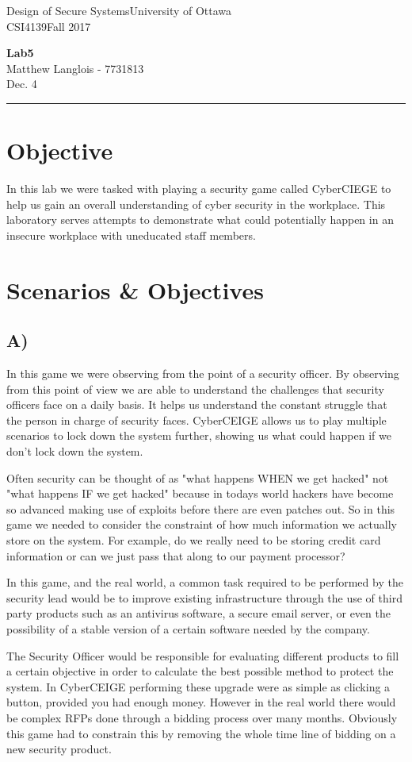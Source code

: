\documentclass[fleqn, 12pt]{article}
\newcommand{\university}{University of Ottawa}
\newcommand{\name}{Matthew Langlois}
\newcommand{\studentNumber}{7731813}
\newcommand{\semester}{Fall 2017}
\newcommand{\assignmentType}{Lab}
\newcommand{\assignmentNumber}{5}
\newcommand{\dueDate}{Dec. 4}
\newcommand{\courseCode}{CSI4139}
\newcommand{\courseTitle}{Design of Secure Systems}
\newcommand{\essayTitle}{<Title>} %
\newcommand{\essaySubtitle}{<subtitle>} %
\newcommand{\essayAbstract}{} %
\newcommand{\beginassignemnt}{
    \newlength\tindent
    \setlength{\tindent}{\parindent}
    \setlength{\parindent}{0pt}

    \thispagestyle{assignment}
    \noindent
    \courseTitle \hfill \university\\
    \courseCode \hfill \semester
    \begin{center}
        \textbf{\assignmentType\text{ }\ifdefempty{\assignmentNumber}{}{\#}\assignmentNumber}\\
        \name \hspace{1pt} - \studentNumber\\
        \dueDate\\
    \end{center}
    \vspace{6pt}
    \hrule
    \vspace{1.5\headsep}
}
\newcommand{\beginessay}{
    \nocite{*}

    \pagestyle{frontmatter}
    \pagenumbering{roman}

    \begin{center}
        \normalsize
        \textsc{\university}\\[5cm]
        \LARGE \textbf{\MakeUppercase{\essayTitle}}\\[0.5cm]
        \large \text{ }\essaySubtitle\text{ }\\[10cm] %
        \normalsize
        \textsc{\name}\\
        \textsc{\studentNumber}\\
        \textsc{\courseCode}\\
        \textsc{\semester}\\
        \textsc{\dueDate}
    \end{center}
    \thispagestyle{empty}

    \newpage
    \tableofcontents
    \newpage

    \iftotalfigures
        \addcontentsline{toc}{section}{\listfigurename}
        \listoffigures
    \fi
    \iftotaltables
        \addcontentsline{toc}{section}{\listtablename}
        \listoftables
    \fi

    \ifdefempty{\essayAbstract}{}{
        \newpage
        \addcontentsline{toc}{section}{Abstract}
        \begin{abstract}
            \essayAbstract
        \end{abstract}

    }
    \label{EndFrontMatter}
    \newpage

    \pagenumbering{arabic}
    \pagestyle{body}
}
\begin{document}
\beginassignemnt

\section*{Objective}

In this lab we were tasked with playing a security game called CyberCIEGE to help us gain an overall understanding of cyber security in the workplace. This laboratory serves attempts to demonstrate what could potentially happen in an insecure workplace with uneducated staff members.

\section*{Scenarios \& Objectives}

\subsection*{A)}

In this game we were observing from the point of a security officer. By observing from this point of view we are able to understand the challenges that security officers face on a daily basis. It helps us understand the constant struggle that the person in charge of security faces. CyberCEIGE allows us to play multiple scenarios to lock down the system further, showing us what could happen if we don't lock down the system.

Often security can be thought of as "what happens WHEN we get hacked" not "what happens IF we get hacked" because in todays world hackers have become so advanced making use of exploits before there are even patches out. So in this game we needed to consider the constraint of how much information we actually store on the system. For example, do we really need to be storing credit card information or can we just pass that along to our payment processor?

In this game, and the real world, a common task required to be performed by the security lead would be to improve existing infrastructure through the use of third party products such as an antivirus software, a secure email server, or even the possibility of a stable version of a certain software needed by the company.

The Security Officer would be responsible for evaluating different products to fill a certain objective in order to calculate the best possible method to protect the system. In CyberCEIGE performing these upgrade were as simple as clicking a button, provided you had enough money. However in the real world there would be complex RFPs done through a bidding process over many months. Obviously this game had to constrain this by removing the whole time line of bidding on a new security product.
\end{document}
